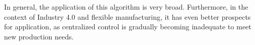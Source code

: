 In general, the application of this algorithm is very broad. Furthermore, in the context of Industry 4.0 and flexible manufacturing, it has even better prospects for application\cite{Industry_41,Industry_42,Industry_43}, as centralized control is gradually becoming inadequate to meet new production needs.
